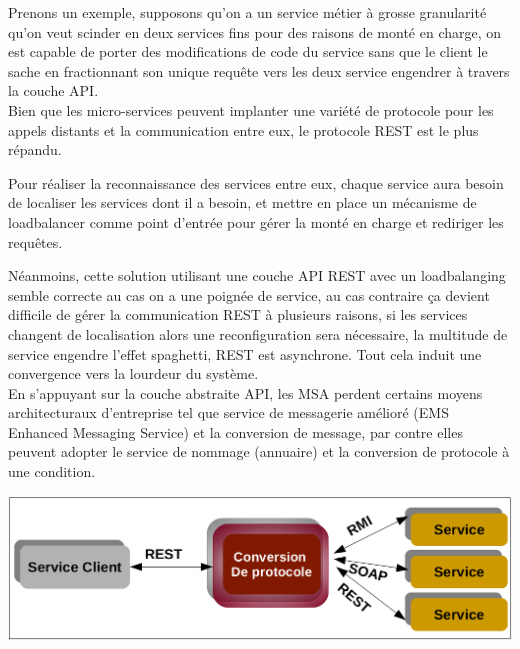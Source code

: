 \documentclass[12pt, a4paper, openany]{report}
\begin{document}
    Prenons un exemple, supposons qu'on a un service métier à grosse granularité qu'on veut scinder en deux services fins pour des raisons de monté en charge, on est capable de porter des modifications de code du service sans que le client le sache en fractionnant son unique requête vers les deux service engendrer à travers la couche API.\\
    
    Bien que les micro-services peuvent implanter une variété de protocole pour les appels distants et la communication entre eux, le protocole REST est le plus répandu.
    
    Pour réaliser la reconnaissance des services entre eux, chaque service aura besoin de localiser les services dont il a besoin, et mettre en place un mécanisme de loadbalancer comme point d'entrée pour gérer la monté en charge et rediriger les requêtes.
    
    Néanmoins, cette solution utilisant une couche API REST avec un loadbalanging semble correcte au cas on a une poignée de service, au cas contraire ça devient difficile de gérer la communication REST à plusieurs raisons, si les services changent de localisation alors une reconfiguration sera nécessaire, la multitude de service engendre l'effet spaghetti, REST est asynchrone. Tout cela induit une convergence vers la lourdeur du système. \\
     
    En s’appuyant sur la couche abstraite API, les MSA perdent certains moyens architecturaux d'entreprise tel que service de messagerie amélioré (EMS Enhanced Messaging Service) et la conversion de message, par contre elles peuvent adopter le service de nommage (annuaire) et la conversion de protocole à une condition.\\
    
    \begin{center}
      \includegraphics[scale=0.3]{convers_protoco_19.png}
      \label{fig19}
    \end{center}
    
\end{document}
